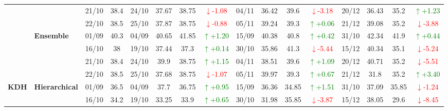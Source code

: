 \documentclass{ieeeaccess}
\begin{document}
{\begin{longtable}{llcc|cccc|cccc|cccc}
& 
& 21/10 & 38.4 & 24/10 & 37.67 & 38.75 & \textcolor{red}{\(\downarrow\)-1.08} & 04/11 & 36.42 & 39.6 & \textcolor{red}{\(\downarrow\)-3.18} & 20/12 & 36.43 & 35.2 & \textcolor{green}{\(\uparrow\)+1.23} \\

&
& 22/10 & 38.5 & 25/10 & 37.87 & 38.75 & \textcolor{red}{\(\downarrow\)-0.88} & 05/11 & 39.24 & 39.3 & \textcolor{green}{\(\uparrow\)+0.06} & 21/12 & 39.08 & 35.2 & \textcolor{red}{\(\downarrow\)-3.88} \\
\cmidrule(lr){2-16}


& \textbf{Ensemble}
& 01/09 & 40.3 & 04/09 & 40.65 & 41.85 & \textcolor{green}{\(\uparrow\)+1.20} & 15/09 & 40.38 & 40.8 & \textcolor{green}{\(\uparrow\)+0.42} & 31/10 & 42.34 & 41.9 & \textcolor{green}{\(\uparrow\)+0.44} \\

& 
& 16/10 & 38 & 19/10 & 37.44 & 37.3 & \textcolor{green}{\(\uparrow\)+0.14} & 30/10 & 35.86 & 41.3 & \textcolor{red}{\(\downarrow\)-5.44} & 15/12 & 40.34 & 35.1 & \textcolor{red}{\(\downarrow\)-5.24} \\

& 
& 21/10 & 38.4 & 24/10 & 39.9 & 38.75 & \textcolor{green}{\(\uparrow\)+1.15} & 04/11 & 38.51 & 39.6 & \textcolor{green}{\(\uparrow\)+1.09} & 20/12 & 40.71 & 35.2 & \textcolor{red}{\(\downarrow\)-5.51} \\

&
& 22/10 & 38.5 & 25/10 & 37.68 & 38.75 & \textcolor{red}{\(\downarrow\)-1.07} & 05/11 & 39.97 & 39.3 & \textcolor{green}{\(\uparrow\)+0.67} & 21/12 & 31.8 & 35.2 & \textcolor{green}{\(\uparrow\)+3.40} \\
\midrule



\multirow{12}{*}{\textbf{KDH}} 
& \textbf{Hierarchical}
& 01/09 & 36.5 & 04/09 & 37.7 & 36.75 & \textcolor{green}{\(\uparrow\)+0.95} & 15/09 & 36.36 & 34.85 & \textcolor{green}{\(\uparrow\)+1.51} & 31/10 & 37.09 & 35.85 & \textcolor{red}{\(\downarrow\)-1.24} \\

&
& 16/10 & 34.2 & 19/10 & 33.25 & 33.9 & \textcolor{green}{\(\uparrow\)+0.65} & 30/10 & 31.98 & 35.85 & \textcolor{red}{\(\downarrow\)-3.87} & 15/12 & 38.05 & 29.6 & \textcolor{red}{\(\downarrow\)-8.45} \\


\end{longtable}}
\end{document}
